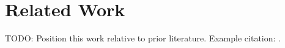 \section{Related Work}
\label{sec:related-work}

TODO: Position this work relative to prior literature. Example citation: \textcite{example2024}.
